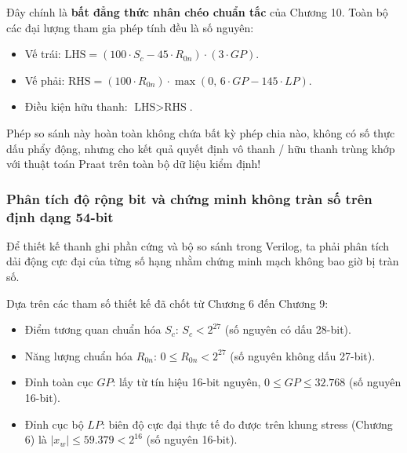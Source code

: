 Đây chính là \textbf{bất đẳng thức nhân chéo chuẩn tắc} của Chương 10. Toàn bộ các đại lượng tham gia phép tính đều là số nguyên:
\begin{itemize}
    \item Vế trái: $\text{LHS} = (100 \cdot S_c - 45 \cdot R_{0n}) \cdot (3 \cdot GP)$.
    \item Vế phải: $\text{RHS} = (100 \cdot R_{0n}) \cdot \max(0,\, 6 \cdot GP - 145 \cdot LP)$.
    \item Điều kiện hữu thanh: $\text{LHS} > \text{RHS}$.
\end{itemize}
Phép so sánh này hoàn toàn không chứa bất kỳ phép chia nào, không có số thực dấu phẩy động, nhưng cho kết quả quyết định vô thanh / hữu thanh trùng khớp với thuật toán Praat trên toàn bộ dữ liệu kiểm định!

\subsubsection*{Phân tích độ rộng bit và chứng minh không tràn số trên định dạng 54-bit}
Để thiết kế thanh ghi phần cứng và bộ so sánh trong Verilog, ta phải phân tích dải động cực đại của từng số hạng nhằm chứng minh mạch không bao giờ bị tràn số.

Dựa trên các tham số thiết kế đã chốt từ Chương 6 đến Chương 9:
\begin{itemize}
    \item Điểm tương quan chuẩn hóa $S_c$: $S_c < 2^{27}$ (số nguyên có dấu 28-bit).
    \item Năng lượng chuẩn hóa $R_{0n}$: $0 \le R_{0n} < 2^{27}$ (số nguyên không dấu 27-bit).
    \item Đỉnh toàn cục $GP$: lấy từ tín hiệu 16-bit nguyên, $0 \le GP \le 32.768$ (số nguyên 16-bit).
    \item Đỉnh cục bộ $LP$: biên độ cực đại thực tế đo được trên khung stress (Chương 6) là $|x_w| \le 59.379 < 2^{16}$ (số nguyên 16-bit).
\end{itemize}

